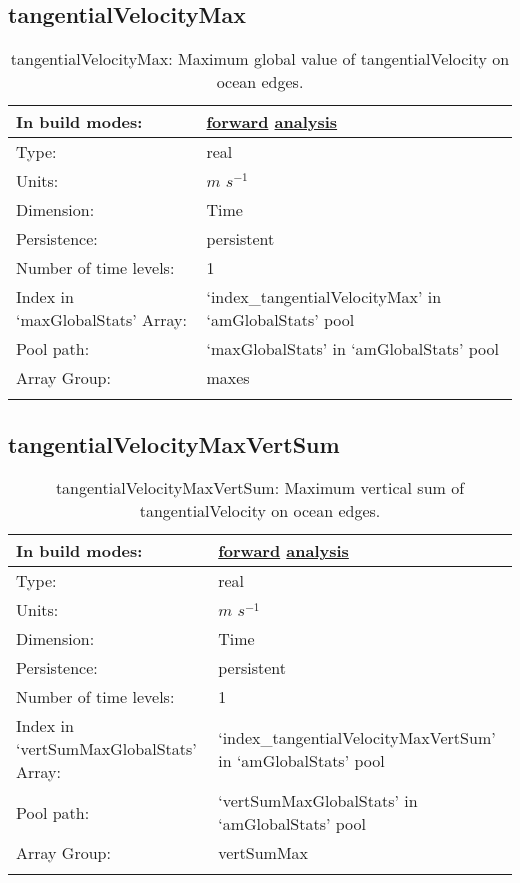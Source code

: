 \subsection[tangentialVelocityMax]{tangentialVelocityMax}
\label{subsec:var_sec_amGlobalStats_tangentialVelocityMax}
\begin{center}
\begin{longtable}{| p{2.0in} | p{4.0in} |}
        \hline 
        In build modes: & \hyperref[subsec:forward_var_tab_amGlobalStats]{forward} \hyperref[subsec:analysis_var_tab_amGlobalStats]{analysis} \\
        \hline 
        Type: & real \\
        \hline 
        Units: & $m$ $s^{-1}$ \\
        \hline 
        Dimension: & Time \\
        \hline 
        Persistence: & persistent \\
        \hline 
        Number of time levels: & 1 \\
        \hline 
		 Index in `maxGlobalStats' Array: & `index\_tangentialVelocityMax' in `amGlobalStats' pool \\
		 \hline 
            Pool path: & `maxGlobalStats' in `amGlobalStats' pool \\
		 \hline 
		 Array Group: & maxes \\
		 \hline 
    \caption{tangentialVelocityMax: Maximum global value of tangentialVelocity on ocean edges.}
\end{longtable}
\end{center}
\subsection[tangentialVelocityMaxVertSum]{tangentialVelocityMaxVertSum}
\label{subsec:var_sec_amGlobalStats_tangentialVelocityMaxVertSum}
\begin{center}
\begin{longtable}{| p{2.0in} | p{4.0in} |}
        \hline 
        In build modes: & \hyperref[subsec:forward_var_tab_amGlobalStats]{forward} \hyperref[subsec:analysis_var_tab_amGlobalStats]{analysis} \\
        \hline 
        Type: & real \\
        \hline 
        Units: & $m$ $s^{-1}$ \\
        \hline 
        Dimension: & Time \\
        \hline 
        Persistence: & persistent \\
        \hline 
        Number of time levels: & 1 \\
        \hline 
		 Index in `vertSumMaxGlobalStats' Array: & `index\_tangentialVelocityMaxVertSum' in `amGlobalStats' pool \\
		 \hline 
            Pool path: & `vertSumMaxGlobalStats' in `amGlobalStats' pool \\
		 \hline 
		 Array Group: & vertSumMax \\
		 \hline 
    \caption{tangentialVelocityMaxVertSum: Maximum vertical sum of tangentialVelocity on ocean edges.}
\end{longtable}
\end{center}
